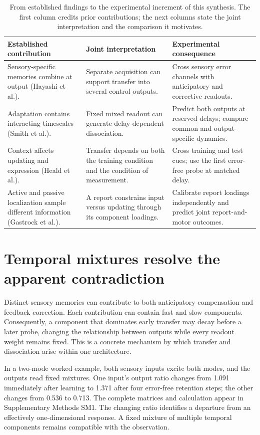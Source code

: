 \documentclass[11pt,a4paper]{article}
\begin{document}
\begin{table}[!htbp]\small\caption{From established findings to the experimental increment of this synthesis. The first column credits prior contributions; the next columns state the joint interpretation and the comparison it motivates.}\label{tab:synthesis}
\begin{tabularx}{\textwidth}{>{\raggedright\arraybackslash}X>{\raggedright\arraybackslash}X>{\raggedright\arraybackslash}X}\toprule
\textbf{Established contribution} & \textbf{Joint interpretation} & \textbf{Experimental consequence}\\\midrule
Sensory-specific memories combine at output (Hayashi et al.). & Separate acquisition can support transfer into several control outputs. & Cross sensory error channels with anticipatory and corrective readouts.\\[6pt]
Adaptation contains interacting timescales (Smith et al.). & Fixed mixed readout can generate delay-dependent dissociation. & Predict both outputs at reserved delays; compare common and output-specific dynamics.\\[6pt]
Context affects updating and expression (Heald et al.). & Transfer depends on both the training condition and the condition of measurement. & Cross training and test cues; use the first error-free probe at matched delay.\\[6pt]
Active and passive localization sample different information (Gastrock et al.). & A report constrains input versus updating through its component loadings. & Calibrate report loadings independently and predict joint report-and-motor outcomes.\\[6pt]
\bottomrule\end{tabularx}\end{table}
\section{Temporal mixtures resolve the apparent contradiction}
Distinct sensory memories can contribute to both anticipatory compensation and feedback correction. Each contribution can contain fast and slow components. Consequently, a component that dominates early transfer may decay before a later probe, changing the relationship between outputs while every readout weight remains fixed. This is a concrete mechanism by which transfer and dissociation arise within one architecture. \cite{hayashi2020,smith2006}

In a two-mode worked example, both sensory inputs excite both modes, and the outputs read fixed mixtures. One input's output ratio changes from 1.091 immediately after learning to 1.371 after four error-free retention steps; the other changes from 0.536 to 0.713. The complete matrices and calculation appear in Supplementary Methods SM1. The changing ratio identifies a departure from an effectively one-dimensional response. A fixed mixture of multiple temporal components remains compatible with the observation.
\end{document}
